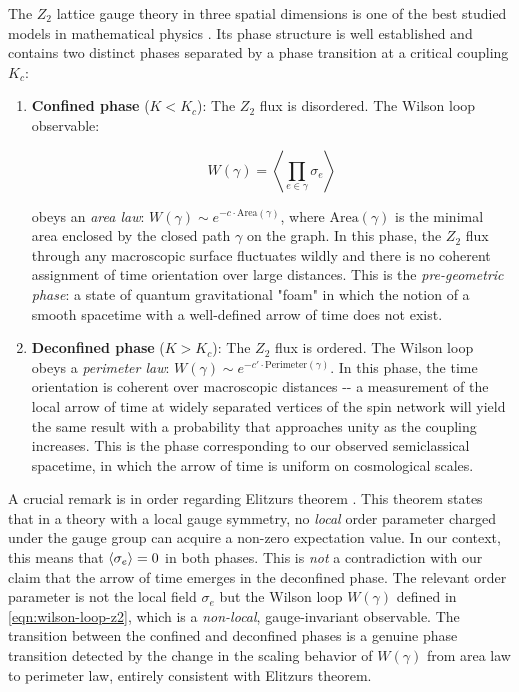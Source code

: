 The \(Z_2\) lattice gauge theory in three spatial dimensions is one of the best studied models in mathematical physics \cite{Wegner1971Duality,Kogut1979An-introduction,Fradkin1979Phase}. Its phase structure is well established and contains two distinct phases separated by a phase transition at a critical coupling \(K_c\):

\begin{enumerate}
\def\labelenumi{\arabic{enumi}.}
\item
  \textbf{Confined phase} (\(K < K_c\)): The \(Z_2\) flux is disordered. The Wilson loop observable:

  \begin{equation}\label{eqn:wilson-loop-z2}
    W(\gamma) = \left\langle \prod_{e \in \gamma} \sigma_e \right\rangle
  \end{equation}

  obeys an \emph{area law}: \(W(\gamma) \sim e^{-c \cdot \text{Area}(\gamma)}\), where \(\text{Area}(\gamma)\) is the minimal area enclosed by the closed path \(\gamma\) on the graph. In this phase, the \(Z_2\) flux through any macroscopic surface fluctuates wildly and there is no coherent assignment of time orientation over large distances. This is the \emph{pre-geometric phase}: a state of quantum gravitational "foam" in which the notion of a smooth spacetime with a well-defined arrow of time does not exist.
\item
  \textbf{Deconfined phase} (\(K > K_c\)): The \(Z_2\) flux is ordered. The Wilson loop obeys a \emph{perimeter law}: \(W(\gamma) \sim e^{-c' \cdot \text{Perimeter}(\gamma)}\). In this phase, the time orientation is coherent over macroscopic distances -\/- a measurement of the local arrow of time at widely separated vertices of the spin network will yield the same result with a probability that approaches unity as the coupling increases. This is the phase corresponding to our observed semiclassical spacetime, in which the arrow of time is uniform on cosmological scales.
\end{enumerate}

A crucial remark is in order regarding Elitzur\textquotesingle s theorem \cite{Elitzur1975Impossibility}. This theorem states that in a theory with a local gauge symmetry, no \emph{local} order parameter charged under the gauge group can acquire a non-zero expectation value. In our context, this means that \(\langle \sigma_e\rangle = 0\) in both phases. This is \emph{not} a contradiction with our claim that the arrow of time emerges in the deconfined phase. The relevant order parameter is not the local field \(\sigma_e\) but the Wilson loop \(W(\gamma)\) defined in \eqref{eqn:wilson-loop-z2}, which is a \emph{non-local}, gauge-invariant observable. The transition between the confined and deconfined phases is a genuine phase transition detected by the change in the scaling behavior of \(W(\gamma)\) from area law to perimeter law, entirely consistent with Elitzur\textquotesingle s theorem.


